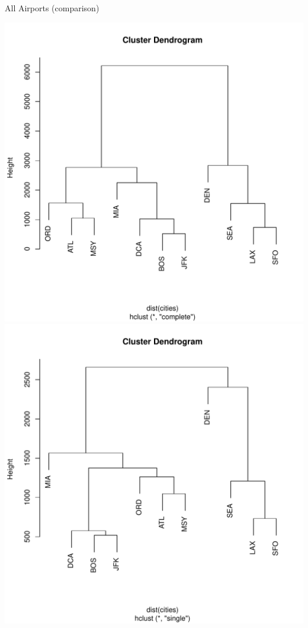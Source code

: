 \documentclass[xcolor=x11names,compress]{beamer}\usepackage[]{graphicx}\usepackage[]{color}
\newenvironment{knitrout}{}{} %
\begin{document}
\begin{frame}[fragile]{All Airports (comparison)}
\begin{knitrout}\tiny
{}\color{fgcolor}

{\centering \includegraphics[width=.6\linewidth]{figure/beamer-airport3-1} 
\includegraphics[width=.6\linewidth]{figure/beamer-airport3-2} 

}



\end{knitrout}
\end{frame}
\end{document}
